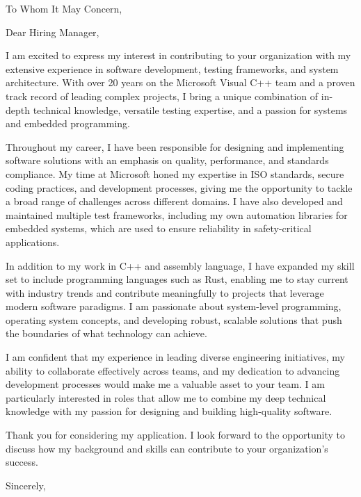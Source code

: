 \documentclass[a4paper,10pt]{letter}
\date{}  %
\begin{document}
\begin{letter}{To Whom It May Concern,}

\opening{Dear Hiring Manager,}

I am excited to express my interest in contributing to your organization with my extensive experience in software development, testing frameworks, and system architecture. With over 20 years on the Microsoft Visual C++ team and a proven track record of leading complex projects, I bring a unique combination of in-depth technical knowledge, versatile testing expertise, and a passion for systems and embedded programming.

Throughout my career, I have been responsible for designing and implementing software solutions with an emphasis on quality, performance, and standards compliance. My time at Microsoft honed my expertise in ISO standards, secure coding practices, and development processes, giving me the opportunity to tackle a broad range of challenges across different domains. I have also developed and maintained multiple test frameworks, including my own automation libraries for embedded systems, which are used to ensure reliability in safety-critical applications.

In addition to my work in C++ and assembly language, I have expanded my skill set to include programming languages such as Rust, enabling me to stay current with industry trends and contribute meaningfully to projects that leverage modern software paradigms. I am passionate about system-level programming, operating system concepts, and developing robust, scalable solutions that push the boundaries of what technology can achieve.

I am confident that my experience in leading diverse engineering initiatives, my ability to collaborate effectively across teams, and my dedication to advancing development processes would make me a valuable asset to your team. I am particularly interested in roles that allow me to combine my deep technical knowledge with my passion for designing and building high-quality software.

Thank you for considering my application. I look forward to the opportunity to discuss how my background and skills can contribute to your organization’s success.

\closing{Sincerely,}

\end{letter}
\end{document}
